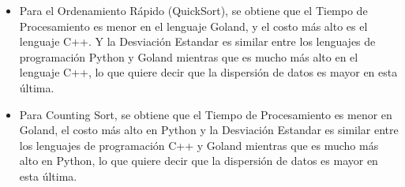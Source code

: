 \documentclass{article}
\begin{document}
\begin{itemize}
            \item Para el Ordenamiento Rápido (QuickSort), se obtiene que el Tiempo de Procesamiento es menor en el lenguaje Goland, y el costo más alto es el lenguaje C++. Y la Desviación Estandar es similar entre los lenguajes de programación Python y Goland mientras que es mucho más alto en el lenguaje C++, lo que quiere decir que la dispersión de datos es mayor en esta última.
\end{itemize}
\begin{itemize}
            \item Para Counting Sort, se obtiene que el Tiempo de Procesamiento es menor en Goland, el costo más alto en Python y la Desviación Estandar es similar entre los lenguajes de programación C++ y Goland mientras que es mucho más alto en Python, lo que quiere decir que la dispersión de datos es mayor en esta última.
\end{itemize}

    
	
		
	
\end{document}
